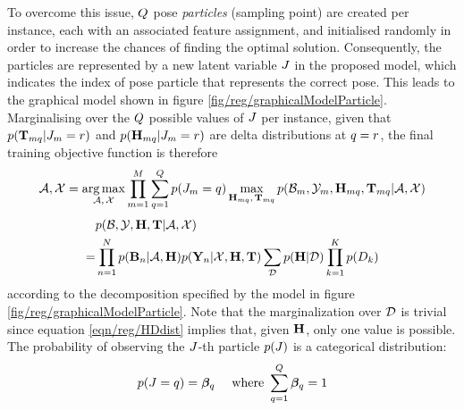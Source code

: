To overcome this issue, $Q$ pose \emph{particles} (sampling point) are created per instance, each with an associated feature assignment, and initialised randomly in order to increase the chances of finding the optimal solution. 
Consequently, the particles are represented by a new latent variable ${J}$ in the proposed model, which indicates the index of pose particle that represents the correct pose. This leads to the graphical model shown in figure \ref{fig/reg/graphicalModelParticle}. Marginalising over the $Q$ possible values of ${J}$ per instance, given that 
$p(\mathbf{T}_{mq}|{J}_{m}  =  r)$ and $p(\mathbf{H}_{mq}|{J}_{m}  =  r)$ are delta distributions at $q=r$, the final training objective function is therefore
\begin{equation}
	\mathcal{A},\mathcal{X} = \operatorname*{arg\,max}_{\mathcal{A},\,\mathcal{X}}
	\prod_{m=1}^M \sum_{q = 1}^{Q} 
	p({J}_{m} = q)
	\max_{\mathbf{H}_{mq},\,\mathbf{T}_{mq}} p(\mathcal{B}_m,\mathcal{Y}_m,\mathbf{H}_{mq},\mathbf{T}_{mq}|\mathcal{A},\mathcal{X})
	\label{eqn/reg/particleapproximation}
\end{equation}
\begin{equation}
	\begin{aligned}
	& p(\mathcal{B},\mathcal{Y},\mathbf{H},\mathbf{T}|\mathcal{A},\mathcal{X}) \\ 
	= & \prod_{n=1}^N
	p(\mathbf{B}_{n}|\mathcal{A},\mathbf{H})
	p(\mathbf{Y}_{n}|\mathcal{X},\mathbf{H},\mathbf{T})
	\sum_{\mathcal{D}}
	p(\mathbf{H}|\mathcal{D})
	\prod_{k=1}^K
	p({D}_{k})
	\end{aligned}
	\label{eqn/reg/decompose}
\end{equation}
according to the decomposition specified by the model in figure \ref{fig/reg/graphicalModelParticle}.
Note that the marginalization over $\mathcal{D}$ is trivial since equation \ref{eqn/reg/HDdist} implies that, given $\mathbf{H}$, only one value is possible. 
The probability of observing the ${J}$-th particle $p({J})$ is a categorical distribution:
\begin{equation}
	\begin{aligned}
		p({J} = q) & = \bm{\beta}_q & \mbox{ where }   \sum_{q=1}^Q \bm{\beta}_q = 1 
	\end{aligned}
\end{equation}

